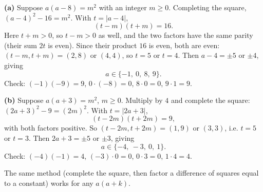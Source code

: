 \textbf{(a)} Suppose $a(a-8)=m^2$ with an integer $m\ge0$. Completing the square, $(a-4)^2-16=m^2$. With $t=|a-4|$,
\[(t-m)(t+m)=16.\]
Here $t+m>0$, so $t-m>0$ as well, and the two factors have the same parity (their sum $2t$ is even). Since their product $16$ is even, both are even: $(t-m,t+m)=(2,8)$ or $(4,4)$, so $t=5$ or $t=4$. Then $a-4=\pm5$ or $\pm4$, giving
\[a\in\boxed{\{-1,\ 0,\ 8,\ 9\}}.\]
Check: $(-1)(-9)=9$, $0\cdot(-8)=0$, $8\cdot0=0$, $9\cdot1=9$.

\textbf{(b)} Suppose $a(a+3)=m^2$, $m\ge0$. Multiply by $4$ and complete the square: $(2a+3)^2-9=(2m)^2$. With $t=|2a+3|$,
\[(t-2m)(t+2m)=9,\]
with both factors positive. So $(t-2m,t+2m)=(1,9)$ or $(3,3)$, i.e. $t=5$ or $t=3$. Then $2a+3=\pm5$ or $\pm3$, giving
\[a\in\boxed{\{-4,\ -3,\ 0,\ 1\}}.\]
Check: $(-4)(-1)=4$, $(-3)\cdot0=0$, $0\cdot3=0$, $1\cdot4=4$.

The same method (complete the square, then factor a difference of squares equal to a constant) works for any $a(a+k)$.
